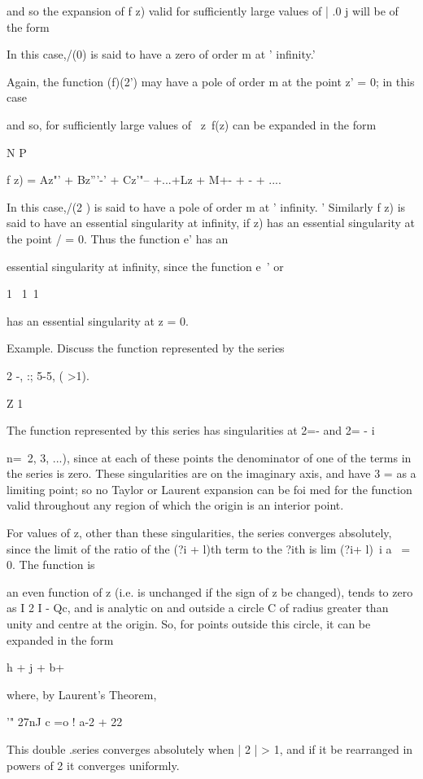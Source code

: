 {{{{and so the expansion of f z) valid for sufficiently large values of |
.0 j will be of the form

In this case,/(0) is said to have a zero of order m at ' infinity.'

%
%

Again, the function (f)(2') may have a pole of order m at the point z'
= 0; in this case

and so, for sufficiently large values of \ z\, f(z) can be expanded in
the form

N P

f z) = Az"' + Bz'''-' + Cz'"-- +...+Lz + M+- + - + ....

In this case,/(2 ) is said to have a pole of order m at ' infinity. '
Similarly f z) is said to have an essential singularity at infinity,
if z) has an essential singularity at the point / = 0. Thus the
function e' has an

essential singularity at infinity, since the function e~' or

1 \ 1\ 1

has an essential singularity at z = 0.

Example. Discuss the function represented by the series

2 -, :; 5-5, ( >1).

Z 1

The function represented by this series has singularities at 2=- and
2= - i

 n=\, 2, 3, ...), since at each of these points the denominator of one
of the terms in the series is zero. These singularities are on the
imaginary axis, and have 3 = as a limiting point; so no Taylor or
Laurent expansion can be foi med for the function valid throughout any
region of which the origin is an interior point.

For values of z, other than these singularities, the series converges
absolutely, since the limit of the ratio of the (?i + l)th term to the
?ith is lim (?i+ l)~i a~ = 0. The function is

an even function of z (i.e. is unchanged if the sign of z be changed),
tends to zero as I 2 I - Qc, and is analytic on and outside a circle
C of radius greater than unity and centre at the origin. So, for
points outside this circle, it can be expanded in the form

h + j + b+

where, by Laurent's Theorem,

'" 27nJ c =o ! a-2 + 22

This double .series converges absolutely when | 2 | > 1, and if it be
rearranged in powers of 2 it converges uniformly.

}}}}
